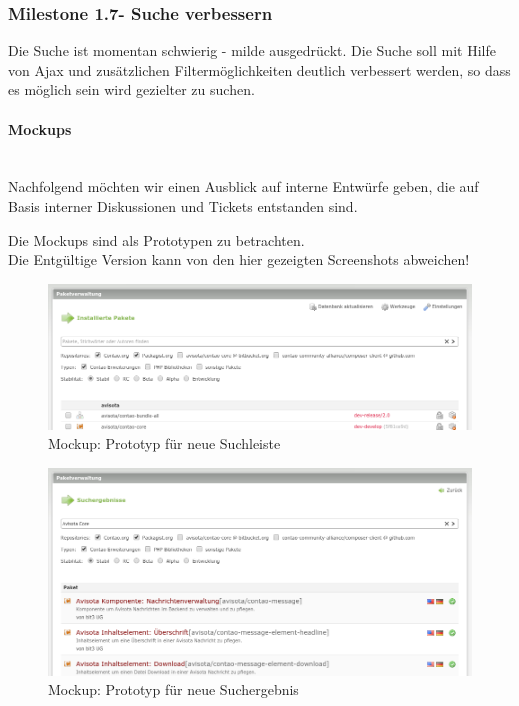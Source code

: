 \documentclass[
paper=a4,
draft=false,%
fontsize=10pt%
]{scrartcl}
\begin{document}
\subsubsection[Milestone 1.7 - Suche verbessern]{Milestone 1.7\footnotemark - Suche verbessern}
\label{subsec:ccc-milestone-1.7}

Die Suche ist momentan schwierig - milde ausgedrückt. Die Suche soll mit Hilfe von Ajax und zusätzlichen Filtermöglichkeiten deutlich verbessert werden, so dass es möglich sein wird gezielter zu suchen.

\paragraph{Mockups} ~\\
Nachfolgend möchten wir einen Ausblick auf interne Entwürfe geben, die auf Basis interner Diskussionen und Tickets entstanden sind.

\begin{danger}
Die Mockups sind als Prototypen zu betrachten. \\
Die Entgültige Version kann von den hier gezeigten Screenshots abweichen!
\end{danger}

\begin{figure}[p]
  \centering
  \includegraphics[width=\textwidth]{bilder/mockup-search-bar}
  \caption{Mockup: Prototyp für neue Suchleiste}
\end{figure}

\begin{figure}[p]
  \centering
  \includegraphics[width=\textwidth]{bilder/mockup-search-result}
  \caption{Mockup: Prototyp für neue Suchergebnis}
\end{figure}
\end{document}
